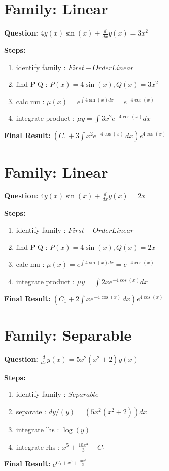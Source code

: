 \documentclass{article}
\begin{document}
\section*{Family: Linear}
\textbf{Question:} $4 y{\left(x \right)} \sin{\left(x \right)} + \frac{d}{d x} y{\left(x \right)} = 3 x^{2}$

\textbf{Steps:}
\begin{enumerate}
\item identify family :  $First-Order Linear$
\item find P Q :  $P(x)=4 \sin{\left(x \right)}, Q(x)=3 x^{2}$
\item calc mu :  $\mu(x) = e^{\int 4 \sin{\left(x \right)} dx} = e^{- 4 \cos{\left(x \right)}}$
\item integrate product :  $\mu y = \int 3 x^{2} e^{- 4 \cos{\left(x \right)}} dx$
\end{enumerate}
\textbf{Final Result:} $\left(C_{1} + 3 \int x^{2} e^{- 4 \cos{\left(x \right)}}\, dx\right) e^{4 \cos{\left(x \right)}}$

\section*{Family: Linear}
\textbf{Question:} $4 y{\left(x \right)} \sin{\left(x \right)} + \frac{d}{d x} y{\left(x \right)} = 2 x$

\textbf{Steps:}
\begin{enumerate}
\item identify family :  $First-Order Linear$
\item find P Q :  $P(x)=4 \sin{\left(x \right)}, Q(x)=2 x$
\item calc mu :  $\mu(x) = e^{\int 4 \sin{\left(x \right)} dx} = e^{- 4 \cos{\left(x \right)}}$
\item integrate product :  $\mu y = \int 2 x e^{- 4 \cos{\left(x \right)}} dx$
\end{enumerate}
\textbf{Final Result:} $\left(C_{1} + 2 \int x e^{- 4 \cos{\left(x \right)}}\, dx\right) e^{4 \cos{\left(x \right)}}$

\section*{Family: Separable}
\textbf{Question:} $\frac{d}{d x} y{\left(x \right)} = 5 x^{2} \left(x^{2} + 2\right) y{\left(x \right)}$

\textbf{Steps:}
\begin{enumerate}
\item identify family :  $Separable$
\item separate :  $dy / (y) = (5 x^{2} \left(x^{2} + 2\right)) dx$
\item integrate lhs :  $\log{\left(y \right)}$
\item integrate rhs :  $x^{5} + \frac{10 x^{3}}{3} + C_1$
\end{enumerate}
\textbf{Final Result:} $e^{C_{1} + x^{5} + \frac{10 x^{3}}{3}}$
\end{document}
